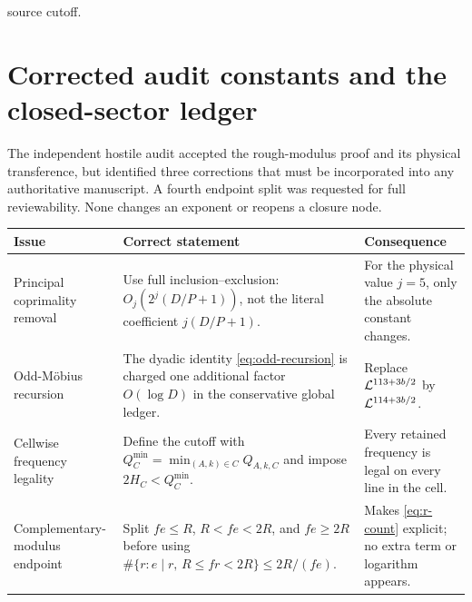 source cutoff.


\section{Corrected audit constants and the closed-sector ledger}\label{sec:auditconstants}

The independent hostile audit accepted the rough-modulus proof and its physical
transference, but identified three corrections that must be incorporated into
any authoritative manuscript.  A fourth endpoint split was requested for full
reviewability.  None changes an exponent or reopens a closure node.

\begin{center}
\small
\begin{tabularx}{\textwidth}{@{}p{}X X@{}}
\toprule
Issue & Correct statement & Consequence \\
\midrule
Principal coprimality removal
& Use full inclusion--exclusion:
  $O_j(2^j(D/P+1))$, not the literal coefficient $j(D/P+1)$.
& For the physical value $j=5$, only the absolute constant changes. \\
\addlinespace
Odd-M\"obius recursion
& The dyadic identity \cref{eq:odd-recursion} is charged one additional
  factor $O(\log D)$ in the conservative global ledger.
& Replace $\mathcal L^{113+3b/2}$ by $\mathcal L^{114+3b/2}$. \\
\addlinespace
Cellwise frequency legality
& Define the cutoff with
  $Q_C^{\min}=\min_{(A,k)\in C}Q_{A,k,C}$ and impose
  $2H_C<Q_C^{\min}$.
& Every retained frequency is legal on every line in the cell. \\
\addlinespace
Complementary-modulus endpoint
& Split $fe\le R$, $R<fe<2R$, and $fe\ge2R$ before using
  $\#\{r:e\mid r,\,R\le fr<2R\}\le2R/(fe)$.
& Makes \cref{eq:r-count} explicit; no extra term or logarithm appears. \\
\bottomrule
\end{tabularx}
\end{center}

